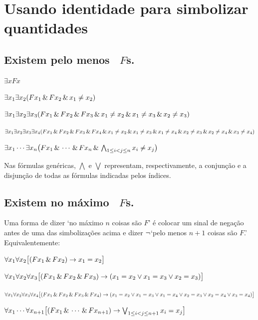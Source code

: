 
\newpage
\section*{Usando identidade para simbolizar quantidades}

\subsection*{Existem pelo menos \blank\ $F$s.}
\label{summary.atleast}

\begin{ekey}
\item[um] $\exists xFx$
\item[dois] $\exists x_1\exists x_2(Fx_1 \,\&\, Fx_2 \,\&\, x_1 \neq x_2)$
\item[três] $\exists x_1\exists x_2\exists x_3(Fx_1 \,\&\, Fx_2 \,\&\, Fx_3 \,\&\, x_1 \neq x_2 \,\&\, x_1 \neq x_3 \,\&\, x_2 \neq x_3)$
\item[quatro] $\exists x_1\exists x_2\exists x_3\exists x_4 (Fx_1 \,\&\, Fx_2 \,\&\, Fx_3 \,\&\, Fx_4 \,\&\, x_1 \neq x_2 \,\&\, x_1 \neq x_3 \,\&\, x_1 \neq x_4 \,\&\, x_2 \neq x_3 \,\&\, x_2 \neq x_4 \,\&\, x_3 \neq x_4)$
\item[n] $\exists x_1\cdots\exists x_n\bigl(Fx_1 \,\&\,\cdots\,\&\, Fx_n \,\&\, \bigwedge_{1\leq i<j\leq n}x_i\neq x_j\bigr)$
\end{ekey}

Nas fórmulas genéricas, $\bigwedge$ e $\bigvee$ representam, respectivamente, a conjunção e a disjunção de todas as fórmulas indicadas pelos índices.

\subsection*{Existem no máximo \blank\ $F$s.}
\label{summary.atmost}

Uma forma de dizer `no máximo $n$ coisas são $F$' é colocar um sinal de negação antes de uma das simbolizações acima e dizer $\neg$`pelo menos $n+1$ coisas são $F$.' Equivalentemente:
\begin{ekey}
\item[um] $\forall x_1\forall x_2\bigl[(Fx_1 \,\&\, Fx_2) \rightarrow x_1=x_2\bigr]$
\item[dois] $\forall x_1\forall x_2\forall x_3\bigl[(Fx_1 \,\&\, Fx_2 \,\&\, Fx_3) \rightarrow (x_1=x_2 \vee x_1=x_3 \vee x_2=x_3)\bigr]$
\item[três] $\forall x_1\forall x_2\forall x_3\forall x_4\bigl[(Fx_1 \,\&\, Fx_2 \,\&\, Fx_3 \,\&\, Fx_4) \rightarrow (x_1=x_2 \vee x_1=x_3 \vee x_1=x_4 \vee x_2=x_3 \vee x_2=x_4 \vee x_3=x_4)\bigr]$
\item[n] $\forall x_1\cdots\forall x_{n+1}
\bigl[(Fx_1\,\&\, \cdots \,\&\, Fx_{n+1}) \rightarrow \bigvee_{1\leq i<j\leq n+1}x_i=x_j\bigr]$
\end{ekey}

